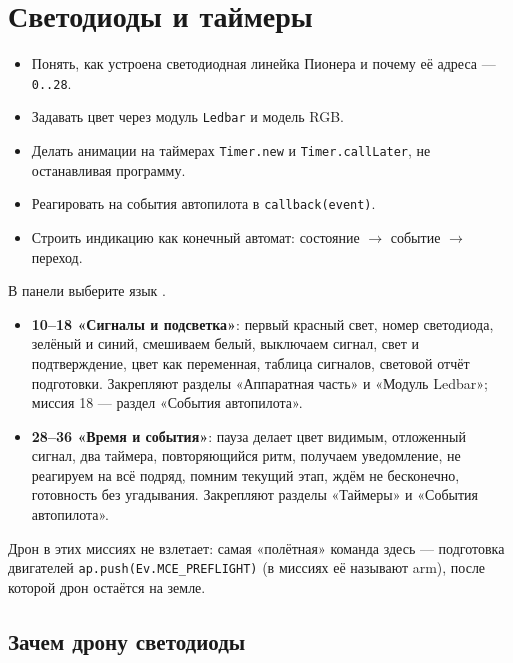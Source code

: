 \section{Светодиоды и таймеры}
\label{sec:leds}

\begin{infobox}
\begin{itemize}
    \item Понять, как устроена светодиодная линейка Пионера и почему её адреса --- \texttt{0..28}.
    \item Задавать цвет через модуль \texttt{Ledbar} и модель RGB.
    \item Делать анимации на таймерах \texttt{Timer.new} и \texttt{Timer.callLater}, не останавливая программу.
    \item Реагировать на события автопилота в \texttt{callback(event)}.
    \item Строить индикацию как конечный автомат: состояние $\to$ событие $\to$ переход.
\end{itemize}
\end{infobox}

\begin{missionbox}
В панели  выберите язык .
\begin{itemize}
    \item \textbf{10--18 «Сигналы и подсветка»}: первый красный свет, номер светодиода, зелёный и синий, смешиваем белый, выключаем сигнал, свет и подтверждение, цвет как переменная, таблица сигналов, световой отчёт подготовки. Закрепляют разделы «Аппаратная часть» и «Модуль Ledbar»; миссия 18 --- раздел «События автопилота».
    \item \textbf{28--36 «Время и события»}: пауза делает цвет видимым, отложенный сигнал, два таймера, повторяющийся ритм, получаем уведомление, не реагируем на всё подряд, помним текущий этап, ждём не бесконечно, готовность без угадывания. Закрепляют разделы «Таймеры» и «События автопилота».
\end{itemize}
Дрон в этих миссиях не взлетает: самая «полётная» команда здесь --- подготовка двигателей \verb|ap.push(Ev.MCE_PREFLIGHT)| (в миссиях её называют arm), после которой дрон остаётся на земле.
\end{missionbox}

\subsection{Зачем дрону светодиоды}

